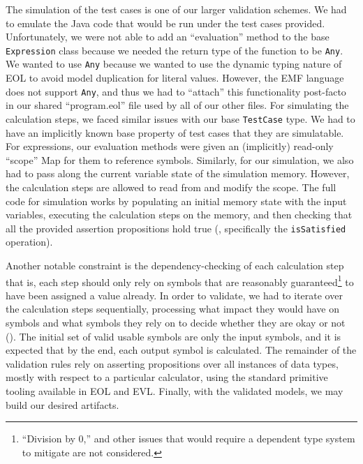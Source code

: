 \documentclass[11pt,fleqn]{article}
\begin{document}
The simulation of the test cases is one of our larger validation schemes. We had
to emulate the Java code that would be run under the test cases provided.
Unfortunately, we were not able to add an ``evaluation'' method to the base
\lstinline{Expression} class because we needed the return type of the function
to be \lstinline{Any}. We wanted to use \lstinline{Any} because we wanted to use
the dynamic typing nature of EOL to avoid model duplication for literal values.
However, the EMF language does not support \lstinline{Any}, and thus we had to
``attach'' this functionality post-facto in our shared ``program.eol'' file used
by all of our other files. For simulating the calculation steps, we faced
similar issues with our base \lstinline{TestCase} type. We had to have an
implicitly known base property of test cases that they are simulatable. For
expressions, our evaluation methods were given an (implicitly) read-only
``scope'' Map for them to reference symbols. Similarly, for our simulation, we
also had to pass along the current variable state of the simulation memory.
However, the calculation steps are allowed to read from and modify the scope.
The full code for simulation works by populating an initial memory state with
the input variables, executing the calculation steps on the memory, and then
checking that all the provided assertion propositions hold true
(, specifically the \lstinline{isSatisfied}
operation).

Another notable constraint is the dependency-checking of each calculation step
\textemdash{} that is, each step should only rely on symbols that are reasonably
guaranteed\footnote{``Division by 0,'' and other issues that would require a
dependent type system to mitigate are not considered.} to have been assigned a
value already. In order to validate, we had to iterate over the calculation
steps sequentially, processing what impact they would have on symbols and what
symbols they rely on to decide whether they are okay or not
(). The initial set of valid usable symbols
are only the input symbols, and it is expected that by the end, each output
symbol is calculated. The remainder of the validation rules rely on asserting
propositions over all instances of data types, mostly with respect to a
particular calculator, using the standard primitive tooling available in EOL and
EVL. Finally, with the validated models, we may build our desired artifacts.

\newpage{}

\end{document}
